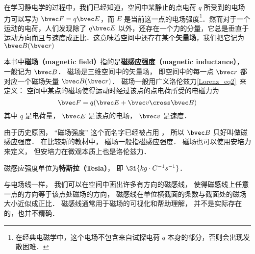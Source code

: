 
\begin{issues}
\issueDraft
\end{issues}


在学习静电学的过程中，我们已经知道，空间中某静止的点电荷 $q$ 所受到的电场力可以写为 $\bvec F=q\bvec E$，而 $E$ 是当前这一点的电场强度\footnote{在经典电磁学中，这个电场不包含来自试探电荷 $q$ 本身的部分，否则会出现发散困难．}．然而对于一个运动的电荷，人们发现除了 $q\bvec E$ 以外，还存在一个力的分量，它总是垂直于运动方向而且与速度成正比．这意味着空间中还存在某个\textbf{矢量场}，我们把它记为 $\bvec B(\bvec r)$

本书中\textbf{磁场（magnetic field）}指的是\textbf{磁感应强度（magnetic inductance）}， 一般记为 $\bvec B$． 磁场是三维空间中的矢量场， 即空间中的每一点 $\bvec r$ 都对应一个磁场矢量 $\bvec B(\bvec r)$． 磁场一般用广义洛伦兹力\autoref{Lorenz_eq2}~来定义： 空间中某点的磁场使得运动时经过该点的点电荷所受的电磁力为
\begin{equation}
\bvec F = q(\bvec E + \bvec v \cross \bvec B)
\end{equation}
其中 $q$ 是电荷量， $\bvec E$ 是该点的电场， $\bvec v$ 是速度．

由于历史原因， “磁场强度” 这个而名字已经被占用%
， 所以 $\bvec B$ 只好叫做磁感应强度． 在比较新的教材中， 磁场一般指磁感应强度． 磁场也可以使用安培力来定义， 但安培力在微观本质上也是洛伦兹力． 


磁感应强度单位为\textbf{特斯拉（Tesla）}， 即 $\Si{kg\cdot C^{-1}s^{-1}}$．

与电场线一样， 我们可以在空间中画出许多有方向的磁感线， 使得磁感线上任意一点的方向等于该点处磁场的方向， 磁感线在单位横截面的条数与截面处的磁场大小近似成正比． 磁感线通常用于磁场的可视化和帮助理解， 并不是实际存在的，也并不精确．
